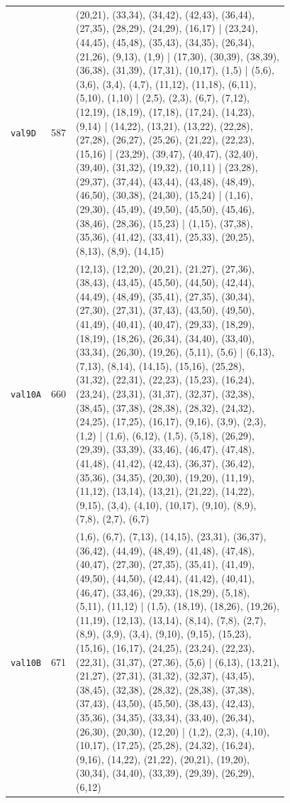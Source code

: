 \begin{landscape}
\begin{longtable}{lr>{\tiny\raggedright\arraybackslash}p{0.78\linewidth}}
\texttt{val9D} & 587 & (20,21), (33,34), (34,42), (42,43), (36,44), (27,35), (28,29), (24,29), (16,17) | (23,24), (44,45), (45,48), (35,43), (34,35), (26,34), (21,26), (9,13), (1,9) | (17,30), (30,39), (38,39), (36,38), (31,39), (17,31), (10,17), (1,5) | (5,6), (3,6), (3,4), (4,7), (11,12), (11,18), (6,11), (5,10), (1,10) | (2,5), (2,3), (6,7), (7,12), (12,19), (18,19), (17,18), (17,24), (14,23), (9,14) | (14,22), (13,21), (13,22), (22,28), (27,28), (26,27), (25,26), (21,22), (22,23), (15,16) | (23,29), (39,47), (40,47), (32,40), (39,40), (31,32), (19,32), (10,11) | (23,28), (29,37), (37,44), (43,44), (43,48), (48,49), (46,50), (30,38), (24,30), (15,24) | (1,16), (29,30), (45,49), (49,50), (45,50), (45,46), (38,46), (28,36), (15,23) | (1,15), (37,38), (35,36), (41,42), (33,41), (25,33), (20,25), (8,13), (8,9), (14,15) \\[2pt]
\texttt{val10A} & 660 & (12,13), (12,20), (20,21), (21,27), (27,36), (38,43), (43,45), (45,50), (44,50), (42,44), (44,49), (48,49), (35,41), (27,35), (30,34), (27,30), (27,31), (37,43), (43,50), (49,50), (41,49), (40,41), (40,47), (29,33), (18,29), (18,19), (18,26), (26,34), (34,40), (33,40), (33,34), (26,30), (19,26), (5,11), (5,6) | (6,13), (7,13), (8,14), (14,15), (15,16), (25,28), (31,32), (22,31), (22,23), (15,23), (16,24), (23,24), (23,31), (31,37), (32,37), (32,38), (38,45), (37,38), (28,38), (28,32), (24,32), (24,25), (17,25), (16,17), (9,16), (3,9), (2,3), (1,2) | (1,6), (6,12), (1,5), (5,18), (26,29), (29,39), (33,39), (33,46), (46,47), (47,48), (41,48), (41,42), (42,43), (36,37), (36,42), (35,36), (34,35), (20,30), (19,20), (11,19), (11,12), (13,14), (13,21), (21,22), (14,22), (9,15), (3,4), (4,10), (10,17), (9,10), (8,9), (7,8), (2,7), (6,7) \\[2pt]
\texttt{val10B} & 671 & (1,6), (6,7), (7,13), (14,15), (23,31), (36,37), (36,42), (44,49), (48,49), (41,48), (47,48), (40,47), (27,30), (27,35), (35,41), (41,49), (49,50), (44,50), (42,44), (41,42), (40,41), (46,47), (33,46), (29,33), (18,29), (5,18), (5,11), (11,12) | (1,5), (18,19), (18,26), (19,26), (11,19), (12,13), (13,14), (8,14), (7,8), (2,7), (8,9), (3,9), (3,4), (9,10), (9,15), (15,23), (15,16), (16,17), (24,25), (23,24), (22,23), (22,31), (31,37), (27,36), (5,6) | (6,13), (13,21), (21,27), (27,31), (31,32), (32,37), (43,45), (38,45), (32,38), (28,32), (28,38), (37,38), (37,43), (43,50), (45,50), (38,43), (42,43), (35,36), (34,35), (33,34), (33,40), (26,34), (26,30), (20,30), (12,20) | (1,2), (2,3), (4,10), (10,17), (17,25), (25,28), (24,32), (16,24), (9,16), (14,22), (21,22), (20,21), (19,20), (30,34), (34,40), (33,39), (29,39), (26,29), (6,12) \\[2pt]

\end{longtable}
\end{landscape}
